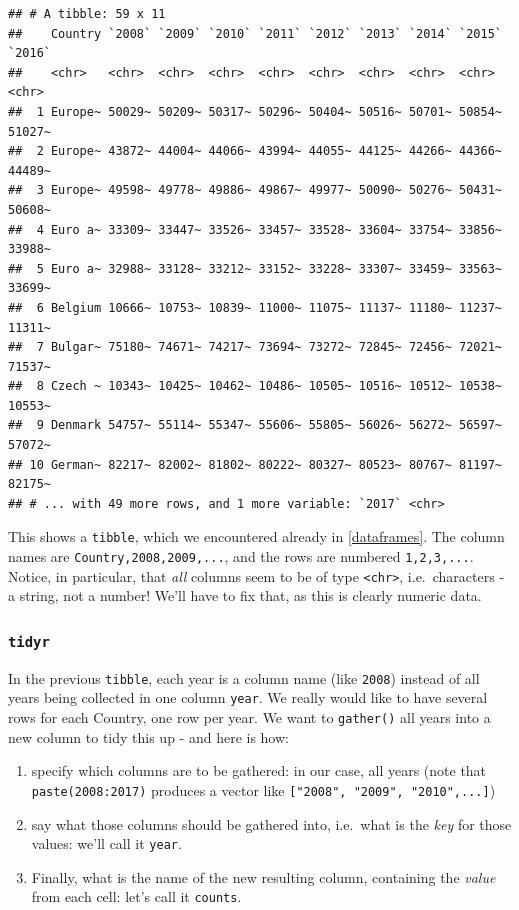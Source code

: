 \documentclass[]{book}
\providecommand{\tightlist}{%
  \setlength{\itemsep}{0pt}\setlength{\parskip}{0pt}}
\theoremstyle{definition}
\theoremstyle{definition}
\theoremstyle{definition}
\theoremstyle{remark}
\begin{document}
\begin{verbatim}
## # A tibble: 59 x 11
##    Country `2008` `2009` `2010` `2011` `2012` `2013` `2014` `2015` `2016`
##    <chr>   <chr>  <chr>  <chr>  <chr>  <chr>  <chr>  <chr>  <chr>  <chr> 
##  1 Europe~ 50029~ 50209~ 50317~ 50296~ 50404~ 50516~ 50701~ 50854~ 51027~
##  2 Europe~ 43872~ 44004~ 44066~ 43994~ 44055~ 44125~ 44266~ 44366~ 44489~
##  3 Europe~ 49598~ 49778~ 49886~ 49867~ 49977~ 50090~ 50276~ 50431~ 50608~
##  4 Euro a~ 33309~ 33447~ 33526~ 33457~ 33528~ 33604~ 33754~ 33856~ 33988~
##  5 Euro a~ 32988~ 33128~ 33212~ 33152~ 33228~ 33307~ 33459~ 33563~ 33699~
##  6 Belgium 10666~ 10753~ 10839~ 11000~ 11075~ 11137~ 11180~ 11237~ 11311~
##  7 Bulgar~ 75180~ 74671~ 74217~ 73694~ 73272~ 72845~ 72456~ 72021~ 71537~
##  8 Czech ~ 10343~ 10425~ 10462~ 10486~ 10505~ 10516~ 10512~ 10538~ 10553~
##  9 Denmark 54757~ 55114~ 55347~ 55606~ 55805~ 56026~ 56272~ 56597~ 57072~
## 10 German~ 82217~ 82002~ 81802~ 80222~ 80327~ 80523~ 80767~ 81197~ 82175~
## # ... with 49 more rows, and 1 more variable: `2017` <chr>
\end{verbatim}

This shows a \texttt{tibble}, which we encountered already in
\ref{dataframes}. The column names are \texttt{Country,2008,2009,...},
and the rows are numbered \texttt{1,2,3,...}. Notice, in particular,
that \emph{all} columns seem to be of type
\texttt{\textless{}chr\textgreater{}}, i.e.~characters - a string, not a
number! We'll have to fix that, as this is clearly numeric data.

\subsubsection{\texorpdfstring{\texttt{tidyr}}{tidyr}}\label{tidyr}

In the previous \texttt{tibble}, each year is a column name (like
\texttt{2008}) instead of all years being collected in one column
\texttt{year}. We really would like to have several rows for each
Country, one row per year. We want to \texttt{gather()} all years into a
new column to tidy this up - and here is how:

\begin{enumerate}
\def\labelenumi{\arabic{enumi}.}
\tightlist
\item
  specify which columns are to be gathered: in our case, all years (note
  that \texttt{paste(2008:2017)} produces a vector like
  \texttt{{[}"2008",\ "2009",\ "2010",...{]}})
\item
  say what those columns should be gathered into, i.e.~what is the
  \emph{key} for those values: we'll call it \texttt{year}.
\item
  Finally, what is the name of the new resulting column, containing the
  \emph{value} from each cell: let's call it \texttt{counts}.
\end{enumerate}
\end{document}
